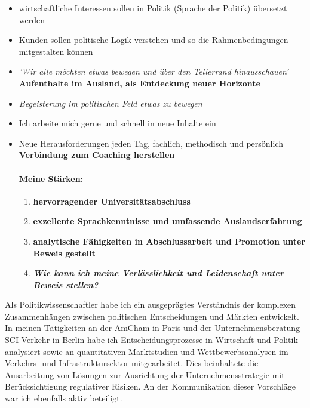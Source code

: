 \documentclass[11pt,a4paper]{article}
\begin{document}
\begin{itemize}

\item wirtschaftliche Interessen sollen in Politik (Sprache der Politik) übersetzt werden

\item Kunden sollen politische Logik verstehen und so die Rahmenbedingungen mitgestalten können

\item \textsl{'Wir alle möchten etwas bewegen und über den Tellerrand hinausschauen'}\\
 \textbf{Aufenthalte im Ausland, als Entdeckung neuer Horizonte}

\item \textsl{Begeisterung im politischen Feld etwas zu bewegen}

\item Ich arbeite mich gerne und schnell in neue Inhalte ein

\item Neue Herausforderungen jeden Tag, fachlich, methodisch und persönlich\\
 \textbf{Verbindung zum Coaching herstellen}

\paragraph*{\textsf{Meine Stärken:}}

\begin{enumerate}

\item \textbf{hervorragender Universitätsabschluss}

\item \textbf{exzellente Sprachkenntnisse und umfassende Auslandserfahrung}

\item \textbf{analytische Fähigkeiten in Abschlussarbeit und Promotion unter Beweis gestellt}

\item \textbf{\textsl{Wie kann ich meine Verlässlichkeit und Leidenschaft unter Beweis stellen?}}

\end{enumerate}



\end{itemize}


\vspace{5cm}

Als Politikwissenschaftler habe ich ein ausgeprägtes Verständnis der komplexen Zusammenhängen zwischen politischen Entscheidungen und Märkten entwickelt. In meinen Tätigkeiten an der AmCham in Paris und der Unternehmensberatung SCI Verkehr in Berlin habe ich Entscheidungsprozesse in Wirtschaft und Politik analysiert sowie an quantitativen Marktstudien und Wettbewerbsanalysen im Verkehrs- und Infrastruktursektor mitgearbeitet. Dies beinhaltete die Ausarbeitung von Lösungen zur Ausrichtung der Unternehmensstrategie mit Berücksichtigung regulativer Risiken. An der Kommunikation dieser Vorschläge war ich ebenfalls aktiv beteiligt.
\end{document}
